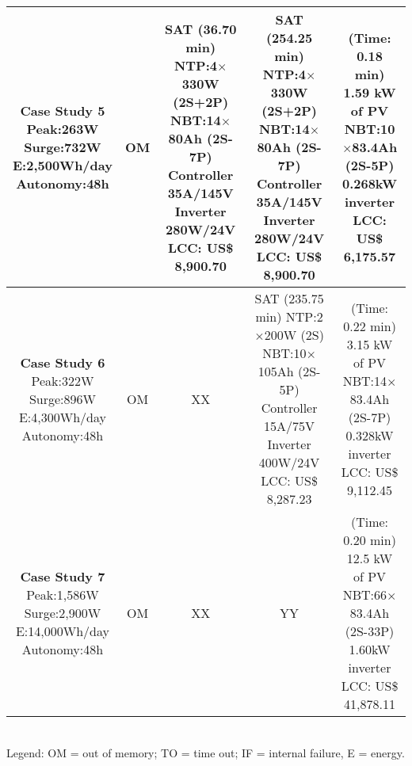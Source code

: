 \begin{table}
\begin{scriptsize}
\begin{tabular}{c|c|c|c|c}
\makecell{\textbf{Case Study 5}\\Peak:263W\\Surge:732W\\E:2,500Wh/day\\Autonomy:48h} & OM & \makecell {SAT (36.70 min) \\NTP:4$\times$330W (2S+2P)\\NBT:14$\times$80Ah (2S-7P)\\Controller 35A/145V\\Inverter 280W/24V \\LCC: US\$ 8,900.70}  & \makecell {SAT (254.25 min) \\NTP:4$\times$330W (2S+2P)\\NBT:14$\times$80Ah (2S-7P)\\Controller 35A/145V\\Inverter 280W/24V \\LCC: US\$ 8,900.70} & \makecell{(Time: 0.18 min)\\1.59 kW of PV\\NBT:10$\times$83.4Ah (2S-5P)\\0.268kW inverter\\LCC: US\$ 6,175.57} \\
\hline
\makecell{\textbf{Case Study 6}\\Peak:322W\\Surge:896W\\E:4,300Wh/day\\Autonomy:48h} & OM & XX & \makecell {SAT (235.75 min) \\NTP:2$\times$200W (2S)\\NBT:10$\times$105Ah (2S-5P)\\Controller 15A/75V\\Inverter 400W/24V \\LCC: US\$ 8,287.23} & \makecell{(Time: 0.22 min)\\3.15 kW of PV\\NBT:14$\times$83.4Ah (2S-7P)\\0.328kW inverter\\LCC: US\$ 9,112.45} \\
\hline
\makecell{\textbf{Case Study 7}\\Peak:1,586W\\Surge:2,900W\\E:14,000Wh/day\\Autonomy:48h} & OM & XX & YY & \makecell{(Time: 0.20 min)\\12.5 kW of PV\\NBT:66$\times$83.4Ah (2S-33P)\\1.60kW inverter\\LCC: US\$ 41,878.11} \\
\hline
\hline
\end{tabular}
\\Legend: OM = out of memory; TO = time out; IF = internal failure, E = energy.
\end{scriptsize}
\end{table}

